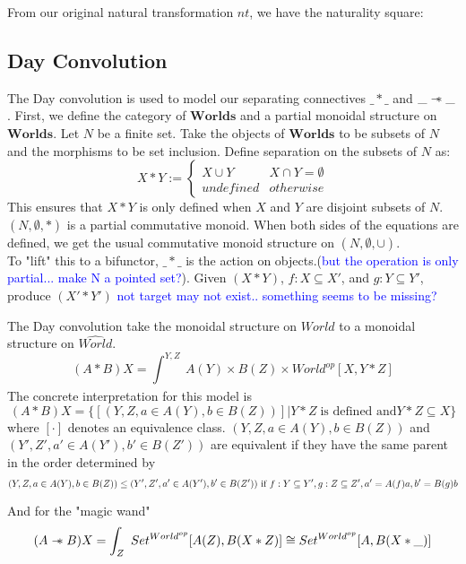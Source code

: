 \documentclass{article}
\newcommand{\blue}[1]{\textcolor{blue}{#1}}
\newcommand\sep{\mathrel{-\mkern-6mu*}}
\begin{document}
From our original natural transformation $nt$, we have the naturality square: 

\subsection{Day Convolution}
The Day convolution is used to model our separating connectives $\_*\_$ and $\_\sep\_$. First, we define the category of $\mathbf{Worlds}$ and a partial monoidal structure on $\mathbf{Worlds}$. Let $N$ be a finite set. Take the objects of $\mathbf{Worlds}$ to be subsets of $N$ and the morphisms to be set inclusion. Define separation on the subsets of $N$ as:
\[ 
X * Y  :=\begin{cases} 
      X \cup Y & X \cap Y = \emptyset \\
      undefined & otherwise 
      \end{cases}
\]
This ensures that $X * Y$ is only defined when $X$ and $Y$ are disjoint subsets of $N$. $(N,\emptyset,*)$ is a partial commutative monoid. When both sides of the equations are defined, we get the usual commutative monoid structure on $(N,\emptyset,\cup)$. \\

To "lift" this to a bifunctor, $\_*\_$ is the action on objects.(\blue{but the operation is only partial... make N a pointed set?}). Given $(X*Y)$, $f : X \subseteq X'$, and $g : Y \subseteq Y'$, produce $(X' * Y')$ \blue{not target may not exist.. something seems to be missing?}

The Day convolution take the monoidal structure on $World$ to a monoidal structure on $\widehat{World}$. 
\[
(A * B) X = \int_{}^{Y,Z}\ A(Y) \times B(Z) \times World^{op}[X,Y * Z]
\]
The concrete interpretation for this model is
\[
(A * B) X = \{[(Y,Z,a \in A(Y), b \in B(Z))] | Y * Z \;\text{is defined and} Y * Z \subseteq X\}
\]
where $[\cdot]$ denotes an equivalence class. $(Y,Z,a \in A(Y), b \in B(Z))$ and $(Y', Z', a' \in A(Y'), b' \in B(Z'))$ are equivalent if they have the same parent in the order determined by
\[
(Y,Z,a \in A(Y), b \in B(Z)) \leq (Y', Z', a' \in A(Y'), b' \in B(Z')) \\ \text{ if } \\
 f: Y \subseteq Y', g: Z \subseteq Z', a' = A(f) a, b' = B(g)b
\]

And for the "magic wand"
\[
(A \sep B) X = \int_{Z}^{}\ Set^{World^{op}}[A(Z), B(X * Z)] \cong Set^{World^{op}}[A, B(X*\_)]
\]






\end{document}
